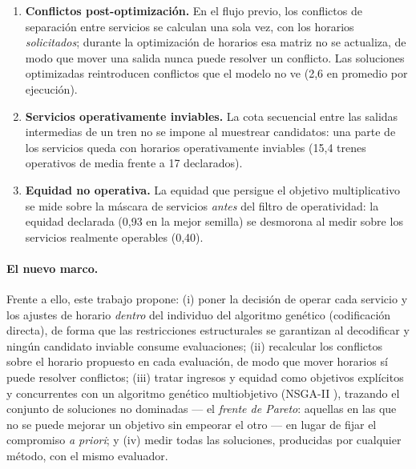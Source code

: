 \documentclass[11pt,a4paper]{article}
\begin{document}
\begin{enumerate}
\item \textbf{Conflictos post-optimización.} En el flujo previo, los
conflictos de separación entre servicios se calculan una sola vez, con los
horarios \emph{solicitados}; durante la optimización de horarios esa matriz
no se actualiza, de modo que mover una salida nunca puede resolver un
conflicto. Las soluciones optimizadas reintroducen conflictos que el modelo
no ve (2,6 en promedio por ejecución).
\item \textbf{Servicios operativamente inviables.} La cota secuencial entre
las salidas intermedias de un tren no se impone al muestrear candidatos:
una parte de los servicios queda con horarios operativamente inviables
(15,4 trenes operativos de media frente a 17 declarados).
\item \textbf{Equidad no operativa.} La equidad que persigue el objetivo
multiplicativo se mide sobre la máscara de servicios \emph{antes} del
filtro de operatividad: la equidad declarada (0,93 en la mejor semilla) se
desmorona al medir sobre los servicios realmente operables (0,40).
\end{enumerate}

\paragraph{El nuevo marco.} Frente a ello, este trabajo propone: (i) poner
la decisión de operar cada servicio y los ajustes de horario \emph{dentro}
del individuo del algoritmo genético (codificación directa), de forma que
las restricciones estructurales se garantizan al decodificar y ningún
candidato inviable consume evaluaciones; (ii) recalcular los conflictos
sobre el horario propuesto en cada evaluación, de modo que mover horarios
sí puede resolver conflictos; (iii) tratar ingresos y equidad como objetivos
explícitos y concurrentes con un algoritmo genético multiobjetivo (NSGA-II
\cite{deb2002}), trazando el conjunto de soluciones no dominadas --- el
\emph{frente de Pareto}: aquellas en las que no se puede mejorar un objetivo
sin empeorar el otro --- en lugar de fijar el compromiso \emph{a priori};
y (iv) medir todas las soluciones, producidas por cualquier método, con el
mismo evaluador.
\end{document}
